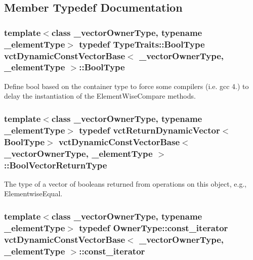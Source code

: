 \subsection{Member Typedef Documentation}
\hypertarget{classvct_dynamic_const_vector_base_a4b96efa633976c8be7648bb4ec0392a7}{
\subsubsection[{Bool\-Type}]{\setlength{\rightskip}{0pt plus 5cm}template$<$class \-\_\-vector\-Owner\-Type, typename \-\_\-element\-Type$>$ typedef {\bf Type\-Traits\-::\-Bool\-Type} {\bf vct\-Dynamic\-Const\-Vector\-Base}$<$ \-\_\-vector\-Owner\-Type, \-\_\-element\-Type $>$\-::{\bf Bool\-Type}}}\label{classvct_dynamic_const_vector_base_a4b96efa633976c8be7648bb4ec0392a7}
Define bool based on the container type to force some compilers (i.\-e. gcc 4.) to delay the instantiation of the Element\-Wise\-Compare methods. \hypertarget{classvct_dynamic_const_vector_base_a2de5b9c0f8c70782c548808d3ae4a453}{
\subsubsection[{Bool\-Vector\-Return\-Type}]{\setlength{\rightskip}{0pt plus 5cm}template$<$class \-\_\-vector\-Owner\-Type, typename \-\_\-element\-Type$>$ typedef {\bf vct\-Return\-Dynamic\-Vector}$<${\bf Bool\-Type}$>$ {\bf vct\-Dynamic\-Const\-Vector\-Base}$<$ \-\_\-vector\-Owner\-Type, \-\_\-element\-Type $>$\-::{\bf Bool\-Vector\-Return\-Type}}}\label{classvct_dynamic_const_vector_base_a2de5b9c0f8c70782c548808d3ae4a453}
The type of a vector of booleans returned from operations on this object, e.\-g., Elementwise\-Equal. \hypertarget{classvct_dynamic_const_vector_base_ad04d1e54698ac5e244d15dfacd0e603c}{
\subsubsection[{const\-\_\-iterator}]{\setlength{\rightskip}{0pt plus 5cm}template$<$class \-\_\-vector\-Owner\-Type, typename \-\_\-element\-Type$>$ typedef Owner\-Type\-::const\-\_\-iterator {\bf vct\-Dynamic\-Const\-Vector\-Base}$<$ \-\_\-vector\-Owner\-Type, \-\_\-element\-Type $>$\-::{\bf const\-\_\-iterator}}}\label{classvct_dynamic_const_vector_base_ad04d1e54698ac5e244d15dfacd0e603c}
